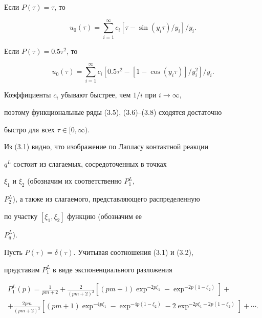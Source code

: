 Если $P(\tau)=\tau$, то


\begin{equation}


u_{0}(\tau)=\sum_{i=1}^{\infty}c_{i}[\tau-\sin(y_{i}\tau)/y_{i}]/y_{i}.


\tag{3.7}


\end{equation}





Если $P(\tau)=0.5\tau^2$, то


\begin{equation}


u_{0}(\tau)=\sum_{i=1}^{\infty}c_{i}[0.5\tau^2-[1-\cos(y_{i}\tau)]/


y_{i}^2]/y_{i}.


\tag{3.8}


\end{equation}


Коэффициенты $c_{i}$ убывают быстрее, чем $1/i$ при $i\to\infty$,


поэтому функциональные ряды (3.5), (3.6)--(3.8) сходятся достаточно


быстро для всех $\tau \in [0,\infty)$.





 Из (3.1) видно, что изображение по Лапласу контактной реакции


$q^L$ состоит из слагаемых, сосредоточенных в точках


$\xi_1$ и $\xi_2$ (обозначим их соответственно $P_{1}^{L}$,


$P_{2}^{L}$), а также из слагаемого, представляющего распределенную


по участку $[\xi_1,\xi_2]$ функцию (обозначим ее


$P_{q}^{L}$).





Пусть $P(\tau)=\delta(\tau)$. Учитывая соотношения (3.1) и (3.2),


представим $P_{1}^{L}$ в виде экспоненциального разложения


\begin{multline}


P_{1}^{L}(p)=\frac{1}{pm+2}+


\frac{2}{(pm+2)^2}[(pm+1)\exp^{-2p\xi_1}-\exp^{-2p(1-\xi_2)}]+ \\


+\frac{2pm}{(pm+2)^3}[(pm+1)\exp^{-4p\xi_1}-


\exp^{-4p(1-\xi_2)}-2\exp^{-2p\xi_1-2p(1-\xi_2)}]+\dotsb.


\tag{3.9}


\end{multline}


